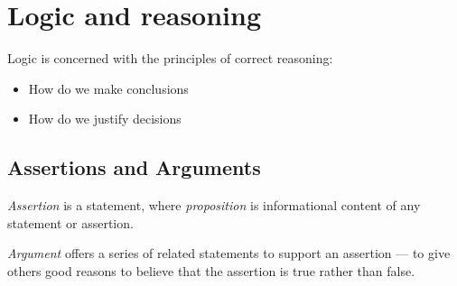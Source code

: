 \documentclass{article}
\begin{document}
\section{Logic and reasoning}
Logic is concerned with the principles of correct reasoning:
\begin{itemize}
  \item How do we make conclusions
  \item How do we justify decisions
\end{itemize}

\subsection{Assertions and Arguments}
\textit{Assertion} is a statement, where \textit{proposition} is informational content of any statement or assertion.
\begin{flushleft}
\textit{Argument} offers a series of related statements to support an assertion — to give others good reasons to believe that the assertion is true rather than false.
\end{flushleft}
\end{document}
